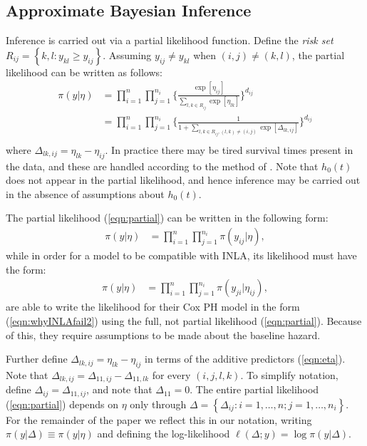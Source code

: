 \documentclass[ba]{imsart}
\begin{document}
\subsection{Approximate Bayesian Inference}

Inference is carried out via a partial likelihood function. Define the \textit{risk set} $R_{ij} = \left\{k,l : y_{kl} \geq y_{ij}\right\}$. Assuming $y_{ij} \neq y_{kl}$ when $(i,j) \neq (k,l)$, the partial likelihood can be written as follows: 
\begin{equation}\begin{aligned}\label{eqn:partial}
\pi(y|\eta) &= \prod_{i=1}^{n}\prod_{j=1}^{n_{i}} \bigg\{\frac{\exp[\eta_{ij}]}{{\sum_{l,k\in R_{ij}}^{}\exp[\eta_{lk}]}}\bigg \}^{d_{ij}} \\
&= \prod_{i=1}^{n}\prod_{j=1}^{n_{i}} \bigg\{\frac{1}{{1 + \sum_{l,k\in R_{ij} , (l,k) \neq (i,j)}\exp[\Delta_{lk,ij}]}}\bigg \}^{d_{ij}} \\
\end{aligned}\end{equation}
where $\Delta_{lk,ij} = \eta_{lk} - \eta_{ij}$. In practice there may be tired survival times present in the data, and these are handled according to the method of \cite{Breslow}. Note that $h_{0}(t)$ does not appear in the partial likelihood, and hence inference may be carried out in the absence of assumptions about $h_{0}(t)$. 

The partial likelihood (\ref{eqn:partial}) can be written in the following form:
\begin{equation}\begin{aligned}\label{eqn:whyINLAfail1}
\pi(y|\eta) &= \prod_{i=1}^{n}\prod_{j=1}^{n_{i}} \pi(y_{ij}|\eta),
\end{aligned}\end{equation}
while in order for a model to be compatible with INLA, its likelihood must have the form:
\begin{equation}\begin{aligned}\label{eqn:whyINLAfail2}
\pi(y|\eta) &= \prod_{i=1}^{n}\prod_{j=1}^{n_{i}} \pi(y_{ji}|\eta_{ij}),
\end{aligned}\end{equation}
\cite{inlacoxph} are able to write the likelihood for their Cox PH model in the form (\ref{eqn:whyINLAfail2}) using the full, not partial likelihood (\ref{eqn:partial}). Because of this, they require assumptions to be made about the baseline hazard.

Further define $\Delta_{lk,ij} = \eta_{lk} - \eta_{ij}$ in terms of the additive predictors (\ref{eqn:eta}). Note that $\Delta_{lk,ij} = \Delta_{11,ij} - \Delta_{11,lk}$ for every $(i,j,l,k)$. To simplify notation, define $\Delta_{ij} = \Delta_{11,ij}$, and note that $\Delta_{11} = 0$. The entire partial likelihood (\ref{eqn:partial}) depends on $\eta$ only through  $\Delta = \left\{\Delta_{ij}: i = 1,\ldots,n; j = 1,\ldots,n_{i} \right\}$. For the remainder of the paper we reflect this in our notation, writing $\pi(y|\Delta) \equiv \pi(y|\eta)$ and defining the log-likelihood $\ell(\Delta; y) = \log\pi(y|\Delta)$.
\end{document}
